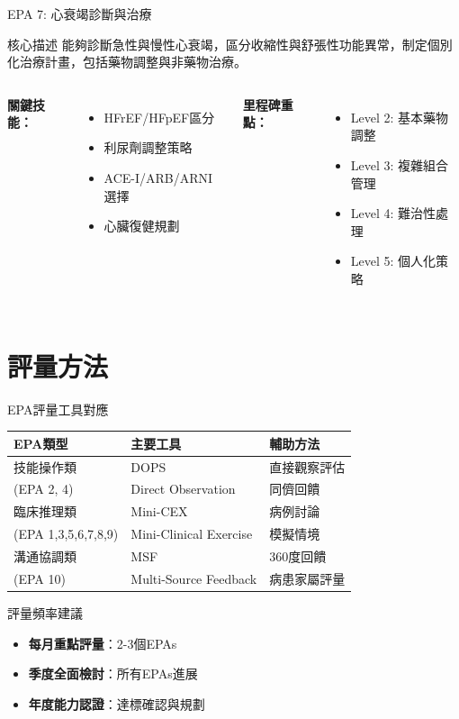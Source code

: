\documentclass[aspectratio=169]{beamer}
\begin{document}
\begin{frame}{EPA 7: 心衰竭診斷與治療}
\begin{alertblock}{核心描述}
能夠診斷急性與慢性心衰竭，區分收縮性與舒張性功能異常，制定個別化治療計畫，包括藥物調整與非藥物治療。
\end{alertblock}

\begin{columns}[c]
\textbf{關鍵技能：}
\begin{itemize}
\item HFrEF/HFpEF區分
\item 利尿劑調整策略
\item ACE-I/ARB/ARNI選擇
\item 心臟復健規劃
\end{itemize}

\textbf{里程碑重點：}
\begin{itemize}
\item Level 2: 基本藥物調整
\item Level 3: 複雜組合管理
\item Level 4: 難治性處理
\item Level 5: 個人化策略
\end{itemize}
\end{columns}
\end{frame}

\section{評量方法}

\begin{frame}{EPA評量工具對應}
\begin{table}
\centering
\footnotesize
\begin{tabular}{|l|l|l|}
\hline
\rowcolor{emergency_blue!20}
\textbf{EPA類型} & \textbf{主要工具} & \textbf{輔助方法} \\
\hline
技能操作類 & DOPS & 直接觀察評估 \\
(EPA 2, 4) & \scriptsize Direct Observation & 同儕回饋 \\
\hline
臨床推理類 & Mini-CEX & 病例討論 \\
(EPA 1,3,5,6,7,8,9) & \scriptsize Mini-Clinical Exercise & 模擬情境 \\
\hline
溝通協調類 & MSF & 360度回饋 \\
(EPA 10) & \scriptsize Multi-Source Feedback & 病患家屬評量 \\
\hline
\end{tabular}
\end{table}

\vspace{0.5cm}

\begin{block}{評量頻率建議}
\begin{itemize}
\item \textbf{每月重點評量}：2-3個EPAs
\item \textbf{季度全面檢討}：所有EPAs進展
\item \textbf{年度能力認證}：達標確認與規劃
\end{itemize}
\end{block}
\end{frame}
\end{document}
